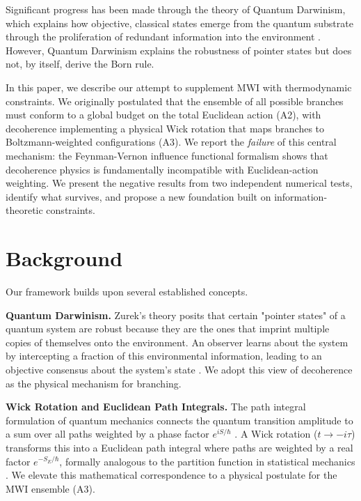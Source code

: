 \documentclass[aps,prl,twocolumn,superscriptaddress,longbibliography]{revtex4-2}
\begin{document}
Significant progress has been made through the theory of Quantum Darwinism, which explains how objective, classical states emerge from the quantum substrate through the proliferation of redundant information into the environment \cite{Zurek2009}. However, Quantum Darwinism explains the robustness of pointer states but does not, by itself, derive the Born rule.

In this paper, we describe our attempt to supplement MWI with thermodynamic constraints. We originally postulated that the ensemble of all possible branches must conform to a global budget on the total Euclidean action (A2), with decoherence implementing a physical Wick rotation that maps branches to Boltzmann-weighted configurations (A3). We report the \emph{failure} of this central mechanism: the Feynman-Vernon influence functional formalism shows that decoherence physics is fundamentally incompatible with Euclidean-action weighting. We present the negative results from two independent numerical tests, identify what survives, and propose a new foundation built on information-theoretic constraints.

\section{Background}

Our framework builds upon several established concepts.

\textbf{Quantum Darwinism.} Zurek's theory posits that certain "pointer states" of a quantum system are robust because they are the ones that imprint multiple copies of themselves onto the environment. An observer learns about the system by intercepting a fraction of this environmental information, leading to an objective consensus about the system's state \cite{Zurek2009}. We adopt this view of decoherence as the physical mechanism for branching.

\textbf{Wick Rotation and Euclidean Path Integrals.} The path integral formulation of quantum mechanics connects the quantum transition amplitude to a sum over all paths weighted by a phase factor $e^{iS/\hbar}$ \cite{Feynman1948}. A Wick rotation ($t \to -i\tau$) transforms this into a Euclidean path integral where paths are weighted by a real factor $e^{-S_E/\hbar}$, formally analogous to the partition function in statistical mechanics \cite{Wick1954}. We elevate this mathematical correspondence to a physical postulate for the MWI ensemble (A3).
\end{document}
